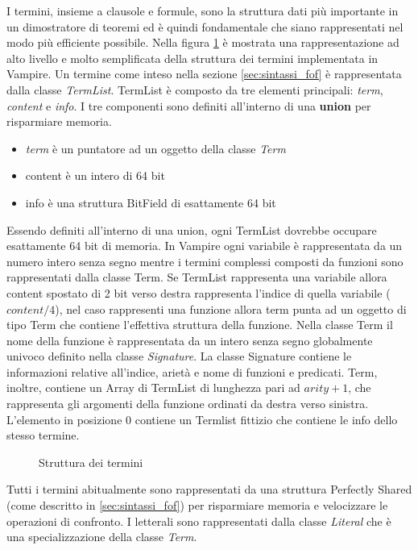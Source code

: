 \documentclass[./main.tex]{subfiles}
\begin{document}
I termini, insieme a clausole e formule, sono la struttura dati più importante in un dimostratore di teoremi ed è quindi fondamentale
che siano rappresentati nel modo più efficiente possibile. 
Nella figura \ref{fig:vampire_terms} è mostrata una rappresentazione ad alto 
livello e molto semplificata della struttura dei termini implementata in Vampire.
Un termine come inteso nella sezione \ref{sec:sintassi_fof} è rappresentata dalla classe \textit{TermList}.
TermList è composto da tre elementi principali: \textit{term}, \textit{content} e \textit{info}.
I tre componenti sono definiti all'interno di una \textbf{union} per risparmiare memoria.
\begin{itemize}
    \item \textit{term} è un puntatore ad un oggetto della classe \textit{Term}
    \item content è un intero di 64 bit
    \item info è una struttura BitField di esattamente 64 bit
\end{itemize}
Essendo definiti all'interno di una union, ogni TermList dovrebbe occupare esattamente 64 bit di memoria.
In Vampire ogni variabile è rappresentata da un numero intero senza segno mentre i termini complessi
composti da funzioni sono rappresentati dalla classe Term. 
Se TermList rappresenta una variabile allora content spostato di 2 bit verso destra rappresenta l'indice di quella variabile ($content/4$),
nel caso rappresenti una funzione allora term punta ad un oggetto di tipo Term che contiene l'effettiva struttura della funzione.
Nella classe Term il nome della funzione è rappresentata da un intero senza segno globalmente univoco definito nella classe \textit{Signature}.
La classe Signature contiene le informazioni relative all'indice, arietà e nome di funzioni e predicati. 
Term, inoltre, contiene un Array di TermList di lunghezza pari ad $arity+1$, che rappresenta gli argomenti della funzione ordinati 
da destra verso sinistra. L'elemento in posizione 0 contiene un Termlist fittizio che contiene le info dello stesso termine.
\begin{figure}[H]
    \centering
    \scalebox{0.55}{
        
    }
    \caption{Struttura dei termini}
    \label{fig:vampire_terms}
\end{figure}
Tutti i termini abitualmente 
sono rappresentati da una struttura Perfectly Shared (come descritto in \ref{sec:sintassi_fof}) per 
risparmiare memoria e velocizzare le operazioni di confronto.
I letterali sono rappresentati dalla classe \textit{Literal} che è una specializzazione della classe \textit{Term}.
\end{document}
